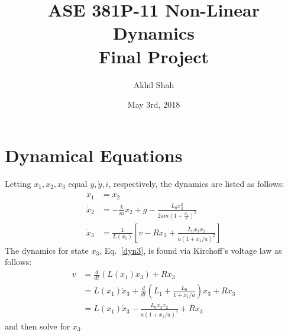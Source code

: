 \documentclass{article}
\title{ASE 381P-11 \- Non-Linear Dynamics \\ Final Project}
\author{Akhil Shah}
\date{May 3rd, 2018}
\begin{document}
\maketitle

\section{Dynamical Equations}
Letting $x_1, x_2, x_3$ equal $y, \dot{y}, i$, respectively, the dynamics are listed as follows:
\begin{align}
    \dot{x}_1 &= x_2 \\
    \dot{x}_2 &= -\frac{k}{m}x_2 + g - \frac{L_0x_3^2}{2am(1+\frac{x_1}{a})^2} \\
    \dot{x}_3 &= \frac{1}{L(x_1)}\left[ v - Rx_3 + \frac{L_0x_3x_2}{a(1+x_1/a)^2}\right] \label{dyn3}
\end{align}
The dynamics for state $x_3$, Eq.~\ref{dyn3}, is found via Kirchoff's voltage law as follows:
\begin{align*}
    v &= \frac{d}{dt}(L(x_1)x_3) + Rx_3 \\
    &= L(x_1)\dot{x}_3 + \frac{d}{dt}\left(L_1 + \frac{L_0}{1 + x_1/a}\right)x_3 + Rx_3 \\
    &= L(x_1)\dot{x}_3 - \frac{L_0x_3x_2}{a(1+x_1/a)^2} + Rx_3
\end{align*}
and then solve for $\dot{x}_3$.
\end{document}
